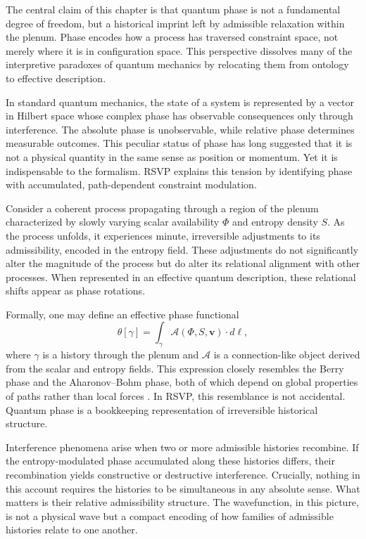 \documentclass[11pt,oneside]{book}
\begin{document}
The central claim of this chapter is that quantum phase is not a fundamental degree of freedom, but a historical imprint left by admissible relaxation within the plenum. Phase encodes how a process has traversed constraint space, not merely where it is in configuration space. This perspective dissolves many of the interpretive paradoxes of quantum mechanics by relocating them from ontology to effective description.

In standard quantum mechanics, the state of a system is represented by a vector in Hilbert space whose complex phase has observable consequences only through interference. The absolute phase is unobservable, while relative phase determines measurable outcomes. This peculiar status of phase has long suggested that it is not a physical quantity in the same sense as position or momentum. Yet it is indispensable to the formalism. RSVP explains this tension by identifying phase with accumulated, path-dependent constraint modulation.

Consider a coherent process propagating through a region of the plenum characterized by slowly varying scalar availability \(\Phi\) and entropy density \(S\). As the process unfolds, it experiences minute, irreversible adjustments to its admissibility, encoded in the entropy field. These adjustments do not significantly alter the magnitude of the process but do alter its relational alignment with other processes. When represented in an effective quantum description, these relational shifts appear as phase rotations.

Formally, one may define an effective phase functional
\[
\theta[\gamma] = \int_\gamma \mathcal{A}(\Phi,S,\mathbf{v}) \cdot d\ell,
\]
where \(\gamma\) is a history through the plenum and \(\mathcal{A}\) is a connection-like object derived from the scalar and entropy fields. This expression closely resembles the Berry phase and the Aharonov--Bohm phase, both of which depend on global properties of paths rather than local forces \cite{berry1984,aharonov1959}. In RSVP, this resemblance is not accidental. Quantum phase is a bookkeeping representation of irreversible historical structure.

Interference phenomena arise when two or more admissible histories recombine. If the entropy-modulated phase accumulated along these histories differs, their recombination yields constructive or destructive interference. Crucially, nothing in this account requires the histories to be simultaneous in any absolute sense. What matters is their relative admissibility structure. The wavefunction, in this picture, is not a physical wave but a compact encoding of how families of admissible histories relate to one another.
\end{document}
